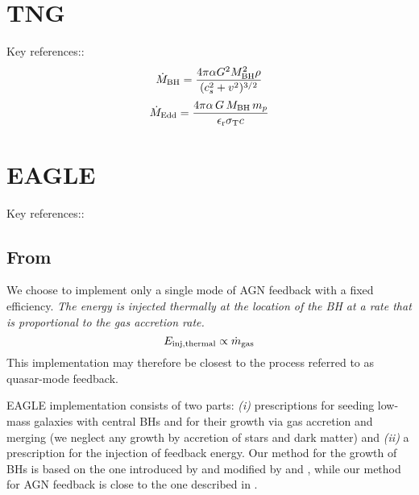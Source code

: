 \documentclass[11pt,a4paper]{article}
\begin{document}
\newpage
\section{TNG}
Key references:: \citet{Weinberger2017, Weinberger2017b, Pillepich2017, Pillepich2018} \\

\begin{equation}
  \dot{M}_{\rm BH} = \frac{4 \pi \alpha G^2 M_{\rm BH}^2 \rho}{(c^2_s + v^2)^{3/2}} 
\end{equation}
\begin{equation}
  \dot{M}_{\rm Edd} = \frac{4 \pi \alpha \, G \, M_{\rm BH} \, m_{p}}{\epsilon_{\rm r} \sigma_{\rm T} c  }
\end{equation}




\newpage
\section{EAGLE}
Key references::\citet{Schaye2015, Crain2015} \\

\subsection{From \citet{Schaye2015}}
We choose to implement only a single mode of AGN feedback with a fixed
efficiency. {\it The energy is injected thermally at the location of the BH
at a rate that is proportional to the gas accretion rate.}
\begin{equation}
E_{\rm inj, thermal} \propto \dot{m}_{\rm gas}
\end{equation}
This implementation may therefore be closest to the process referred to as quasar-mode feedback.

EAGLE implementation consists of two parts: {\it (i)} prescriptions for seeding low-mass galaxies with central BHs and for their growth via gas accretion and merging (we neglect any growth by accretion of stars and dark matter) and {\it (ii)} a prescription for the injection of feedback energy. Our method for the growth of BHs is based on the one introduced by \citet{Springel2005} and modified by \citet{Booth_Schaye2009} and \citet{Rosas-Guevara2015}, while our method for AGN feedback is close to the one described in \citet{Booth_Schaye2009}. 
\end{document}
